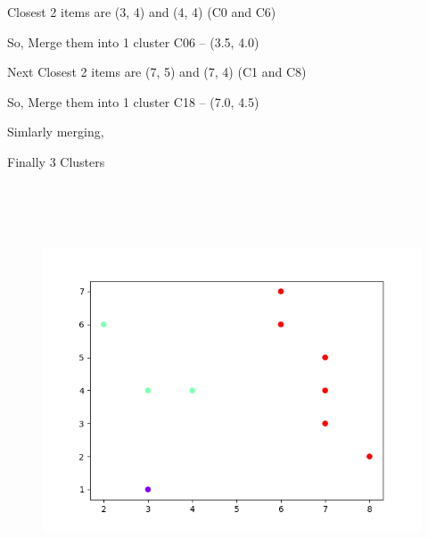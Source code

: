 \documentclass[12pt]{article}
\renewcommand{\_}{\kern-1.5pt\textunderscore\kern-1.5pt}
\begin{document}

\par

{\fontsize{14pt}{16.8pt}\selectfont Closest 2 items are (3, 4) and (4, 4) (C0 and C6)\par}\par

{\fontsize{14pt}{16.8pt}\selectfont So, Merge them into 1 cluster C06 – (3.5, 4.0)\par}\par

{\fontsize{14pt}{16.8pt}\selectfont Next Closest 2 items are (7, 5) and (7, 4) (C1 and C8)\par}\par

{\fontsize{14pt}{16.8pt}\selectfont So, Merge them into 1 cluster C18 – (7.0, 4.5)\par}\par

{\fontsize{14pt}{16.8pt}\selectfont Simlarly merging, \par}\par

{\fontsize{14pt}{16.8pt}\selectfont Finally 3 Clusters\par}\par




\begin{figure}[H]
	\begin{Center}
		\includegraphics[width=6.4in,height=4.8in]{./media/image5.png}
	\end{Center}
\end{figure}
\end{document}
